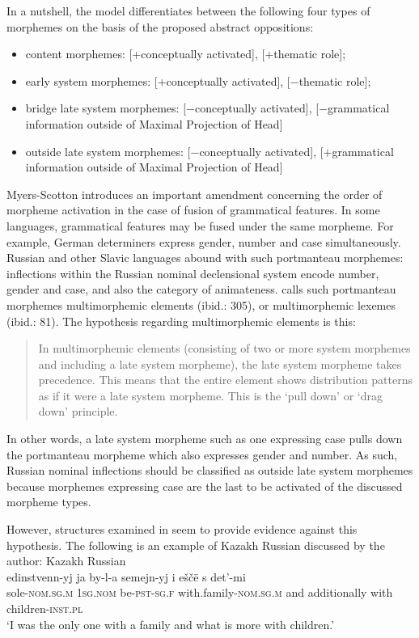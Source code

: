 In a nutshell, the model differentiates between the following four types of morphemes on the basis of the proposed abstract oppositions:
\begin{itemize} 
\item content morphemes: [+conceptually activated], [+thematic role];
\item early system morphemes: [+conceptually activated], [−thematic role];
\item bridge late system morphemes: [−conceptually activated], [−grammatical information outside of Maximal Projection of Head]
\item outside late system morphemes: [−conceptually activated], [+grammatical information outside of Maximal Projection of Head]
\end{itemize}

Myers-Scotton introduces an important amendment concerning the order of morpheme activation in the case of fusion of grammatical features. In some languages, grammatical features may be fused under the same morpheme. For example, German determiners express gender, number and case simultaneously. Russian and other Slavic languages abound with such portmanteau morphemes: inflections within the Russian nominal declensional system encode number, gender and case, and also the category of animateness. \citet[][]{myers-scotton-contact-2002} calls such portmanteau morphemes multimorphemic elements (ibid.: 305), or multimorphemic lexemes (ibid.: 81). The hypothesis regarding multimorphemic elements is this: 

\begin{quote}In multimorphemic elements (consisting of two or more system morphemes and including a late system morpheme), the late system morpheme takes precedence. This means that the entire element shows distribution patterns as if it were a late system morpheme. This is the `pull down' or `drag down' principle. \citep[][305]{myers-scotton-contact-2002}
\end{quote}

\begin{sloppypar}
\noindent In other words, a late system morpheme such as one expressing case pulls down the portmanteau morpheme which also expresses gender and number. As such, Russian nominal inflections should be classified as outside late system morphemes because morphemes expressing case are the last to be activated of the discussed morpheme types.
\end{sloppypar}

However, structures examined in \citet{muhamedowa-untersuchung-2006} seem to provide evidence against this hypothesis. The following is an example of Kazakh Russian discussed by the author:
\ea \label{ex:1:15}
Kazakh Russian \citep[92]{muhamedowa-untersuchung-2006}\\
\gll edinstvenn-yj ja by-l-a semejn-yj i eščë s det'-mi\\
	sole-\textsc{nom.sg.m} \textsc{1sg.nom} be-\textsc{pst-sg.f} with.family-\textsc{nom.sg.m} and additionally with children-\textsc{inst.pl}\\
\glt `I was the only one with a family and what is more with children.'
\z

